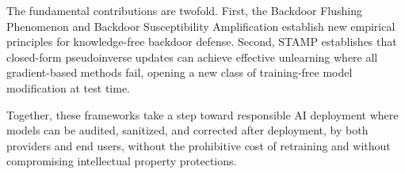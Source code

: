The fundamental contributions are twofold. First, the Backdoor Flushing Phenomenon and Backdoor Susceptibility Amplification establish new empirical principles for knowledge-free backdoor defense. Second, STAMP establishes that closed-form pseudoinverse updates can achieve effective unlearning where all gradient-based methods fail, opening a new class of training-free model modification at test time.

Together, these frameworks take a step toward responsible AI deployment where models can be audited, sanitized, and corrected after deployment, by both providers and end users, without the prohibitive cost of retraining and without compromising intellectual property protections.